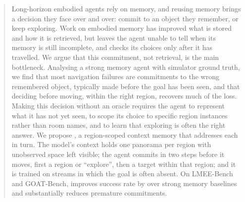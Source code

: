 \begin{abstract}
Long-horizon embodied agents rely on memory, and reusing memory brings a
decision they face over and over: commit to an object they remember, or keep
exploring. Work on embodied memory has improved what is stored and how it is
retrieved, but leaves the agent unable to tell when its memory is still
incomplete, and checks its choices only after it has travelled. We argue that
this commitment, not retrieval, is the main bottleneck. Analysing a strong
memory agent with simulator ground truth, we find that most navigation
failures are commitments to the wrong remembered object, typically made before
the goal has been seen, and that deciding before moving, within
the right region, recovers much of the loss. Making this decision without an
oracle requires the agent to represent what it has not yet seen, to scope its
choice to specific region instances rather than room names, and to learn that
exploring is often the right answer. We propose \ours, a region-scoped context
memory that addresses each in turn. The model's context holds one panorama per
region with unobserved space left visible; the agent commits in two steps
before it moves, first a region or ``explore'', then a target within that
region; and it is trained on streams in which the goal is often absent. On
LMEE-Bench and GOAT-Bench, \ours{} improves success rate by  over
strong memory baselines and substantially reduces premature commitments.
\end{abstract}
